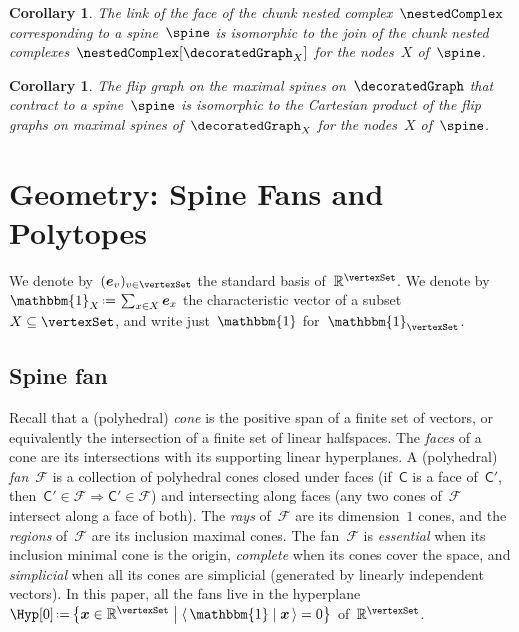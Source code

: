 \documentclass{amsart}
\newtheorem{corollary}[theorem]{Corollary}
\theoremstyle{definition}
\newcommand{\R}{\mathbb{R}} %
\renewcommand{\c}[1]{{\mathcal{#1}}} %
\renewcommand{\b}[1]{{\boldsymbol{#1}}} %
\newcommand{\bigset}[2]{\big\{ #1 \;\big|\; #2 \big\}} %
\newcommand{\dotprod}[2]{\langle \, #1 \; | \; #2 \, \rangle} %
\newcommand{\one}{\mathbbm{1}} %
\newcommand{\eqdef}{\mbox{\,\raisebox{0.2ex}{\scriptsize\ensuremath{\mathrm:}}\ensuremath{=}\,}} %
\newcommand{\eg}{\textit{e.g.}~} %
\newcommand{\darkblue}{\color{darkblue}} %
\newcommand{\defn}[1]{\textsl{\darkblue #1}} %
\newcommand{\polytope}[1]{\mathsf{#1}} %
\newcommand{\weight}{\omega} %
\begin{document}
\begin{corollary}
  \label{coro:linksNestedComplex}
  The link of the face of the chunk nested complex~$\nestedComplex$ corresponding to a spine~$\spine$ is isomorphic to the join of the chunk nested complexes~$\nestedComplex[\decoratedGraph_X]$ for the nodes~$X$ of~$\spine$.
\end{corollary}

\begin{corollary}
  \label{coro:linksFlipGraph}
  The flip graph on the maximal spines on~$\decoratedGraph$ that contract to a spine~$\spine$ is isomorphic to the Cartesian product of the flip graphs on maximal spines of~$\decoratedGraph_X$ for the nodes~$X$ of~$\spine$.
\end{corollary}


\section{Geometry: Spine Fans and Polytopes}
\label{sec:geometry}

We denote by~$(\b{e}_v)_{v \in \vertexSet}$ the standard basis of~$\R^{\vertexSet}$.
We denote by~$\one_X \eqdef \sum_{x \in X} \b{e}_x$ the characteristic vector of a subset~$X \subseteq \vertexSet$, and write just~$\one$ for~$\one_{\vertexSet}$.


\subsection{Spine fan}
\label{subsec:spineFan}

%
Recall that a (polyhedral) \defn{cone} is the positive span of a finite set of vectors, or equivalently the intersection of a finite set of linear halfspaces.
The \defn{faces} of a cone are its intersections with its supporting linear hyperplanes.
A (polyhedral) \defn{fan}~$\c{F}$ is a collection of polyhedral cones closed under faces (if~$\polytope{C}$ is a face of~$\polytope{C'}$, then~$\polytope{C'} \in \c{F} \Rightarrow \polytope{C'} \in \c{F}$) and intersecting along faces (any two cones of~$\c{F}$ intersect along a face of both).
The \defn{rays} of~$\c{F}$ are its dimension~$1$ cones, and the \defn{regions} of~$\c{F}$ are its inclusion maximal cones.
The fan~$\c{F}$ is \defn{essential} when its inclusion minimal cone is the origin, \defn{complete} when its cones cover the space, and \defn{simplicial} when all its cones are simplicial (generated by linearly independent vectors).
In this paper, all the fans live in the hyperplane~${\Hyp[0] \eqdef \bigset{\b{x} \in \R^{\vertexSet}}{\dotprod{\one}{\b{x}} = 0}}$ of~$\R^{\vertexSet}$.
\end{document}
